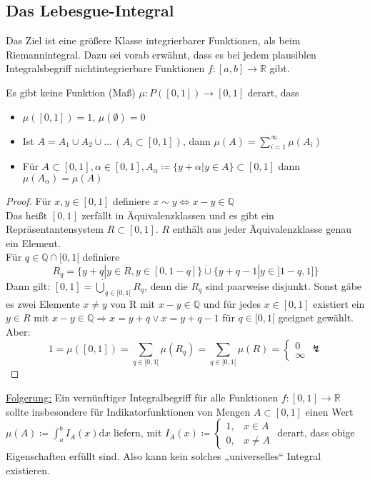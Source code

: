 \subsection{Das Lebesgue-Integral}

Das Ziel ist eine größere Klasse integrierbarer Funktionen, als beim Riemannintegral. Dazu sei vorab erwähnt, dass es bei jedem plausiblen Integralsbegriff nichtintegrierbare Funktionen $f\colon [a,b] \to \mathbb{R}$ gibt.\\
\begin{claim_n} Es gibt keine Funktion (Maß) $\mu\colon P([0,1]) \to [0,1]$ derart, dass
	\begin{itemize}
		\item $\mu([0,1]) = 1, \, \mu(\emptyset) = 0$
		\item Ist $A = A_1 \dot{\cup} A_2 \dot{\cup} ... \,(A_i \subset [0,1])$, dann $\mu(A) = \sum_{i=1}^{\infty} \mu(A_i)$
		\item Für $A \subset [0,1], \alpha \in [0,1], A_{\alpha} \coloneqq \{y + \alpha | y \in A\} \subset [0,1]$ dann $\mu(A_{\alpha}) = \mu(A)$
	\end{itemize}
\end{claim_n}
\begin{proof} Für $x,y\in [0,1]$ definiere $x \sim y \Leftrightarrow x-y \in \mathbb{Q}$\\
	Das heißt $[0,1]$ zerfällt in Äquivalenzklassen und es gibt ein Repräsentantensystem $R \subset [0,1]$. $R$ enthält aus jeder Äquivalenzklasse genau ein Element.\\
	Für $q\in \mathbb{Q} \cap [0,1[$ definiere 
	\[
		R_q = \{y + q | y \in R, y \in [0,1-q]\} \dot{\cup} \{ y+q-1|y \in ]1-q,1] \}
	\]
	Dann gilt: $[0,1] = \dot{\bigcup}_{q\in[0,1[} R_q$, denn die $R_q$ sind paarweise disjunkt. Sonst gäbe es zwei Elemente $x\neq y$ von R mit $x-y \in \mathbb{Q}$ und für jedes $x \in [0,1]$ existiert ein $y \in R$ mit $x-y \in \mathbb{Q} \Rightarrow x = y + q \lor x = y + q - 1$ für $q\in [0,1[$ geeignet gewählt.\\
	Aber: \[1 = \mu([0,1]) = \sum_{q \in [0,1[} \mu(R_q) = \sum_{q \in [0,1[} \mu(R) =
		\left \{
		\begin{matrix}
			0 \\
			\infty
		\end{matrix}
		\right . \lightning\]
\end{proof}
\underline{Folgerung:} Ein vernünftiger Integralbegriff für alle Funktionen $f\colon [0,1] \to \mathbb{R}$ sollte insbesondere für Indikatorfunktionen von Mengen $A \subset [0,1]$ einen Wert $\mu(A)\coloneqq \int_{a}^{b} I_A(x) \text{d}x$ liefern, mit $I_A(x) \coloneqq \left \{ \begin{matrix}
		1, & x \in A \\
		0, & x \ne A
	\end{matrix}
	\right .$ derart, dass obige Eigenschaften erfüllt sind. Also kann kein solches „universelles“ Integral existieren.

